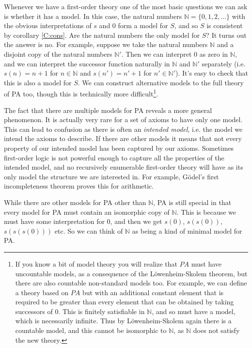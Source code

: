 \documentclass{article}
\theoremstyle{plain}
\theoremstyle{definition}
\newcommand{\bbN}{\mathbb{N}}
\begin{document}
Whenever we have a first-order theory one of the most basic questions we can ask is whether it has a model. In this case, the natural numbers $\mathbb{N}=\{0,1,2,\ldots\}$ with the obvious interpretations of $s$ and $0$ form a model for $S$, and so $S$ is consistent by corollary \ref{C:cons}. Are the natural numbers the only model for $S$? It turns out the answer is no. For example, suppose we take the natural numbers $\mathbb{N}$ and a disjoint copy of the natural numbers $\mathbb{N}'$. Then we can interpret $0$ as zero in $\mathbb{N}$, and we can interpret the successor function naturally in $\mathbb{N}$ and $\mathbb{N}'$ separately (i.e. $s(n)=n+1$ for $n\in \mathbb{N}$ and $s(n')=n'+1$ for $n'\in\mathbb{N}'$). It's easy to check that this is also a model for $S$. We can construct alternative models to the full theory of PA too, though this is technically more difficult\footnote{If you know a bit of model theory you will realize that $PA$ must have uncountable models, as a consequence of the L\"owenheim-Skolem theorem, but there are also countable non-standard models too. For example, we can define a theory based  on $PA$ but with an additional constant element that is required to be greater than every element that can be obtained by taking successors of 0. This is finitely satisfiable in $\bbN$, and so must have a model, which is necessarily infinite. Thus by L\"owenheim-Skolem again there is a countable model, and this cannot be isomorphic to $\bbN$, as $\bbN$ does not satisfy the new theory.}.

The fact that there are multiple models for PA reveals a more general phenomenon. It is actually very rare for a set of axioms to have only one model. This can lead to confusion as there is often an \emph{intended model}, i.e. the model we intend the axioms to describe. If there are other models it means that not every property of our intended model has been captured by our axioms. Sometimes first-order logic is not powerful enough to capture all the properties of the intended model, and no recursively enumerable first-order theory will have as its only model the structure we are interested in. For example, G\"odel's first incompleteness theorem proves this for arithmetic.

While there are other models for PA other than $\mathbb{N}$, PA is still special in that every model for PA must contain an isomorphic copy of $\mathbb{N}$. This is because we must have some interpretation for $0$, and then we get $s(0)$, $s(s(0))$, $s(s(s(0)))$ etc. So we can think of $\mathbb{N}$ as being a kind of minimal model for PA.  
\end{document}
